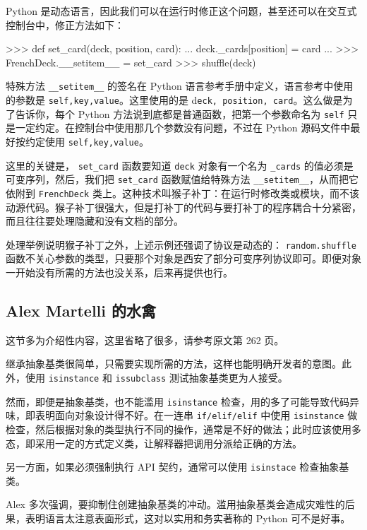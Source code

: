 Python 是动态语言，因此我们可以在运行时修正这个问题，甚至还可以在交互式控制台中，修正方法如下：

\begin{python}
>>> def set_card(deck, position, card):
...     deck._cards[position] = card 
... 
>>> FrenchDeck.__setitem__ = set_card 
>>> shuffle(deck)
\end{python}

特殊方法 \texttt{\_\_setitem\_\_} 的签名在 Python 语言参考手册中定义，语言参考中使用的参数是 \texttt{self,key,value}。这里使用的是 d\texttt{eck, position, card}。这么做是为了告诉你，每个 Python 方法说到底都是普通函数，把第一个参数命名为 \texttt{self} 只是一定约定。在控制台中使用那几个参数没有问题，不过在 Python 源码文件中最好按约定使用 \texttt{self,key,value}。

这里的关键是， \texttt{set\_card} 函数要知道 \texttt{deck} 对象有一个名为 \texttt{\_cards} 的值必须是可变序列，然后，我们把 \texttt{set\_card} 函数赋值给特殊方法 \texttt{\_\_setitem\_\_}，从而把它依附到 \texttt{FrenchDeck} 类上。这种技术叫猴子补丁：在运行时修改类或模块，而不该动源代码。猴子补丁很强大，但是打补丁的代码与要打补丁的程序耦合十分紧密，而且往往要处理隐藏和没有文档的部分。

处理举例说明猴子补丁之外，上述示例还强调了协议是动态的： \texttt{random.shuffle} 函数不关心参数的类型，只要那个对象是西安了部分可变序列协议即可。即便对象一开始没有所需的方法也没关系，后来再提供也行。

\subsection{Alex Martelli 的水禽}

这节多为介绍性内容，这里省略了很多，请参考原文第 262 页。

继承抽象基类很简单，只需要实现所需的方法，这样也能明确开发者的意图。此外，使用 \texttt{isinstance} 和 \texttt{issubclass} 测试抽象基类更为人接受。

然而，即便是抽象基类，也不能滥用 \texttt{isinstance} 检查，用的多了可能导致代码异味，即表明面向对象设计得不好。在一连串 \texttt{if/elif/elif} 中使用 \texttt{isinstance} 做检查，然后根据对象的类型执行不同的操作，通常是不好的做法；此时应该使用多态，即采用一定的方式定义类，让解释器把调用分派给正确的方法。

另一方面，如果必须强制执行 API 契约，通常可以使用 \texttt{isinstace} 检查抽象基类。

Alex 多次强调，要抑制住创建抽象基类的冲动。滥用抽象基类会造成灾难性的后果，表明语言太注意表面形式，这对以实用和务实著称的 Python 可不是好事。

